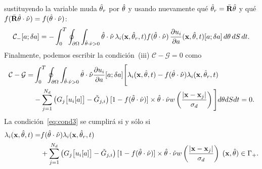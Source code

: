 sustituyendo la variable muda $\hat{\theta}_r$ por $\hat{\theta}$ y usando nuevamente qué $\hat{\theta}_r=\bar{\mathbf{R}} \hat{\theta}$ 
y qué $f(\bar{\mathbf{R}} \hat{\theta} \cdot \hat{\nu})=f(\hat{\theta} \cdot \hat{\nu})$:
\begin{equation}
\begin{split}
\begin{aligned}
  \displaystyle\mathcal{C}_-[a;\delta a]=-\int_0^T
  \oint_{\partial \Omega} \int_{\hat{\theta} \cdot \hat{\nu}>0} \hat{\theta} \cdot \hat{\nu} \, \lambda_i(\mathbf{x},\hat{\theta}_r,t)
  f(\hat{\theta} \cdot \hat{\nu}) \, \frac{\partial u_i}{\partial a}(\mathbf{x},\hat{\theta},t)[a;\delta a] \, d\theta \, dS \, dt.
\end{aligned}
\end{split}
\label{eq:C2m3}
\end{equation}
Finalmente, podemos escribir la condición~(iii) $\mathcal{C}-\mathcal{G}=0$ como
\begin{equation}
\begin{split}
\begin{aligned}
  \displaystyle\mathcal{C}-\mathcal{G}=&\int_0^T
  \oint_{\partial \Omega} \int_{\hat{\theta} \cdot \hat{\nu}>0} \hat{\theta} \cdot \hat{\nu} 
  \frac{\partial u_i}{\partial a}[a;\delta a] \Bigg[  \lambda_i(\mathbf{x},\hat{\theta},t)
    -f(\hat{\theta} \cdot \hat{\nu})  \lambda_i(\mathbf{x},\hat{\theta}_r,t)   \\
    &- \sum_{j=1}^{N_d} \left( G_j\big[u_i[a]\big]-
    \tilde {G}_{j,i} \right) [1-f(\hat{\theta} \cdot \hat{\nu})]
   \times \hat{\theta} \cdot \hat{\nu} w\left( \frac{ |\mathbf{x}-\mathbf{x}_j |}{\sigma_d}
  \right) 
   \Bigg] d\theta  dS dt=0.
\end{aligned}
\end{split}
\label{eq:cond3}
\end{equation}
La condición~\eqref{eq:cond3} se cumplirá si y sólo si 
\begin{equation}
\begin{split}
\begin{aligned}
  \lambda_i(\mathbf{x},\hat{\theta},t)=&
    f(\hat{\theta} \cdot \hat{\nu}) \lambda_i(\mathbf{x},\hat{\theta}_r,t) \\
   &+ \sum_{j=1}^{N_d} \left( G_j\big[u_i[a]\big]-
    \tilde {G}_{j,i} \right) [1-f(\hat{\theta} \cdot \hat{\nu})]
   \times \hat{\theta} \cdot \hat{\nu} w\left( \frac{ |\mathbf{x}-\mathbf{x}_j |}{\sigma_d}
  \right)\; (\mathbf{x},\hat{\theta})\in \Gamma_+.
\end{aligned}
\end{split}
\label{eq:cond4}
\end{equation}

